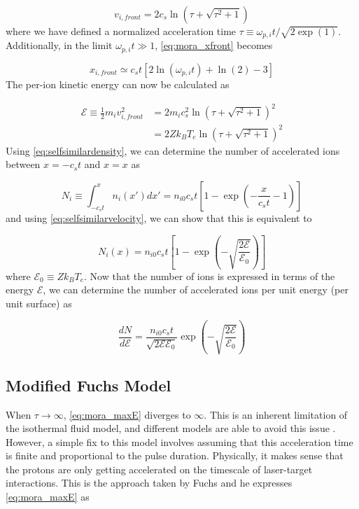\begin{equation}
	v_{i,front} = 2 c_s \ln(\tau + \sqrt{\tau^2 + 1})	
\end{equation}
where we have defined a normalized acceleration time $\tau \equiv \omega_{p,i} t / \sqrt{2 \exp(1)}$. Additionally, in the limit $\omega_{p,i} t \gg 1$, \autoref{eq:mora_xfront} becomes

\begin{equation}
	x_{i, front} \simeq c_s t [2 \ln(\omega_{p,i} t) + \ln(2) - 3] \label{eq:mora_xfront_simple}
\end{equation}
The per-ion kinetic energy can now be calculated as

\begin{align}
	\mathcal{E} \equiv \frac{1}{2} m_i v_{i,front}^2 &= 2 m_i c_s^2 \ln(\tau + \sqrt{\tau^2 + 1})^2  \nonumber\\
	&= 2 Z k_B T_{e} \ln(\tau + \sqrt{\tau^2 + 1})^2 \label{eq:mora_maxE}
\end{align}
Using \autoref{eq:selfsimilardensity}, we can determine the number of accelerated ions between $x = -c_s t$ and $x = x$ as

\begin{equation}
	N_i \equiv \int_{-c_s t}^{x} n_i(x') dx' = n_{i0} c_s t [1 - \exp(-\frac{x}{c_s t} - 1)]
\end{equation}
and using \autoref{eq:selfsimilarvelocity}, we can show that this is equivalent to 

\begin{equation}
	N_i(x) = n_{i0} c_s t [1 - \exp(-\sqrt{\frac{2 \mathcal{E}}{\mathcal{E}_0}})] \label{eq:numprotons}
\end{equation}
where $\mathcal{E}_0 \equiv Z k_B T_e$. Now that the number of ions is expressed in terms of the energy $\mathcal{E}$, we can determine the number of accelerated ions per unit energy (per unit surface) as 

\begin{equation}
	\frac{d N}{d \mathcal{E}} = \frac{n_{i0} c_s t}{\sqrt{2 \mathcal{E} \mathcal{E}_0}} \exp(-\sqrt{\frac{2 \mathcal{E}}{\mathcal{E}_0}}) \label{eq:dNdE}
\end{equation}
	
\subsection{Modified Fuchs Model} \label{sec:fuchsv1}

When $\tau \rightarrow \infty$, \cref{eq:mora_maxE} diverges to $\infty$. This is an inherent limitation of the isothermal fluid model, and different models are able to avoid this issue \cite{Mora_2005_PRE,Passoni_2010_NJoP,Schreiber_2006_PRL}. However, a simple fix to this model involves assuming that this acceleration time is finite and proportional to the pulse duration. Physically, it makes sense that the protons are only getting accelerated on the timescale of  laser-target interactions. This is the approach taken by Fuchs \cite{Fuchs_2005_Nat} and he expresses \autoref{eq:mora_maxE} as 

